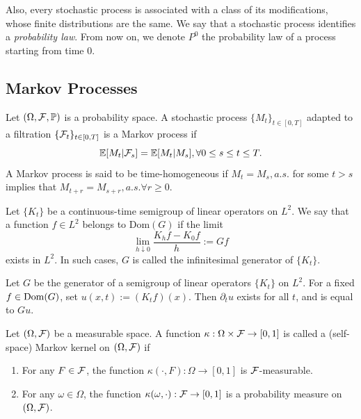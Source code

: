 Also, every stochastic process is associated with a class of its modifications, whose finite distributions are the same. We say that a stochastic process identifies a \textit{probability law}. From now on, we denote $P^0$ the probability law of a process starting from time $0$.

\subsection{Markov Processes}

\begin{definition}
  Let $(\Omega, \mathcal{F}, \mathbb{P})$ is a probability space. A stochastic process $\{M_t\}_{t\in[0,T]}$ adapted to a filtration $\{\mathcal{F}_t\}_{t\in[0,T]}$ is a Markov process if
  \begin{equation}
    \mathbb{E}[M_t|\mathcal{F}_s] = \mathbb{E}[M_t|M_s],  \forall 0 \le s \le t \le T.
  \end{equation}
  A Markov process is said to be time-homogeneous if $M_t = M_s, a.s.$ for some $t > s$ implies that $M_{t+r} = M_{s+r}, a.s. \forall r\ge0$.
\end{definition}

\begin{definition}
  Let $\{K_t\}$ be a continuous-time semigroup of linear operators on $L^2$. We say that a function $f\in L^2$ belongs to $\mathrm{Dom}(G)$ if the limit
  \begin{equation}
    \lim\limits_{h\downarrow 0}\dfrac{K_hf - K_0f}{h} := Gf
  \end{equation}
  exists in $L^2$. In such cases, $G$ is called the infinitesimal generator of $\{K_t\}$.
\end{definition}

\begin{theorem}
  Let $G$ be the generator of a semigroup of linear operators $\{K_t\}$ on $L^2$. For a fixed $f\in\mathrm{Dom}(G)$, set $u(x,t) := (K_tf)(x)$. Then $\partial_t u$ exists for all $t$, and is equal to $Gu$.
\end{theorem}


\begin{definition}
  Let $(\Omega, \mathcal{F})$ be a measurable space. A function $\kappa: \Omega\times\mathcal{F}\to[0,1]$ is called a (self-space) Markov kernel on $(\Omega, \mathcal{F})$  if
  \begin{enumerate}[label=(\roman*), ref=(\roman*)]
    \item For any $F\in\mathcal{F}$, the function $\kappa(\cdot, F): \Omega \to [0,1]$ is $\mathcal{F}$-measurable.
    \item For any $\omega\in\Omega$, the function $\kappa(\omega, \cdot): \mathcal{F}\to [0,1]$ is a probability measure on $(\Omega, \mathcal{F})$.
  \end{enumerate}
\end{definition}

